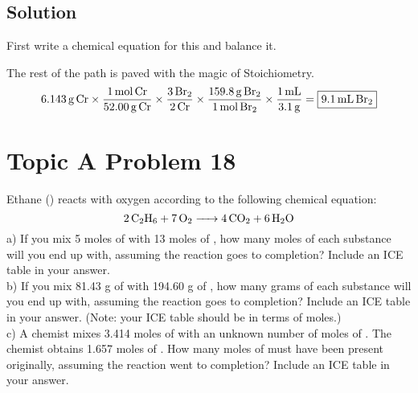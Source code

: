 \documentclass[10pt]{article}
\begin{document}
        \subsection{Solution}
            First write a chemical equation for this and balance it.
            \begin{center}
            \end{center}

            The rest of the path is paved with the magic of Stoichiometry.
            \begin{equation}
                6.143\,\unit{\gram}\,\ce{Cr}    \times  \frac{1\,\unit{\mole}\,\ce{Cr}}{52.00\,\unit{\gram}\,\ce{Cr}}
                                                \times  \frac{3\,\ce{Br2}}{2\,\ce{Cr}}
                                                \times  \frac{159.8\,\unit{\gram}\,\ce{Br2}}{1\,\unit{\mole}\,\ce{Br2}}
                                                \times  \frac{1\,\unit{\milli\liter}}{3.1\,\unit{\gram}}
                    =   \boxed{9.1\,\unit{\milli\liter}\,\ce{Br2}}
            \end{equation}

    \pagebreak
    \section{Topic A Problem 18}
        Ethane () reacts with oxygen according to the following chemical equation:
        \begin{equation}
            \ce{2 C2H6 + 7 O2 -> 4 CO2 + 6 H2O}
        \end{equation}
        a) If you mix 5 moles of  with 13 moles of , how many moles of each substance will you end up with, assuming the reaction goes to completion? 
        Include an ICE table in your answer.\\
        b) If you mix 81.43 g of  with 194.60 g of , how many grams of each substance will you end up with, assuming the reaction goes to completion? 
        Include an ICE table in your answer. 
        (Note: your ICE table should be in terms of moles.)\\
        c) A chemist mixes 3.414 moles of  with an unknown number of moles of . 
        The chemist obtains 1.657 moles of . 
        How many moles of  must have been present originally, assuming the reaction went to completion? 
        Include an ICE table in your answer.
\end{document}
